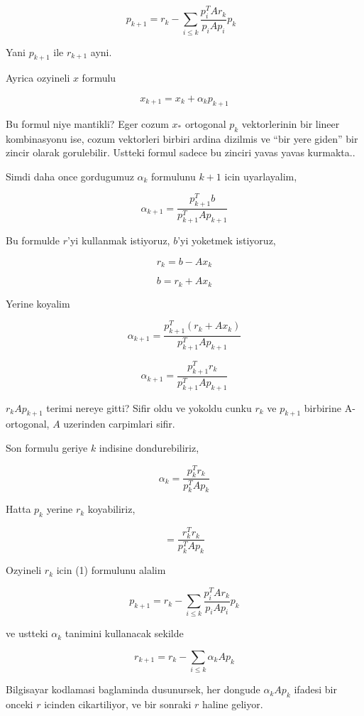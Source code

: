 \documentclass[12pt,fleqn]{article}\usepackage{../common}
\begin{document}
\[ p_{k+1} = r_k - \sum_{i \le k} \frac{ p_i^TAr_k}{p_iAp_i}p_k  \ \ \
\label{1} \]

Yani $p_{k+1}$ ile $r_{k+1}$ ayni. 

Ayrica ozyineli $x$ formulu

\[ x_{k+1} = x_k + \alpha_k p_{k+1} \]

Bu formul niye mantikli? Eger cozum $x_*$ ortogonal $p_k$ vektorlerinin bir
lineer kombinasyonu ise, cozum vektorleri birbiri ardina dizilmis ve ``bir
yere giden'' bir zincir olarak gorulebilir. Ustteki formul sadece bu
zinciri yavas yavas kurmakta..

Simdi daha once gordugumuz $\alpha_{k}$ formulunu $k+1$ icin uyarlayalim,

\[ \alpha_{k+1} = \frac{p_{k+1}^Tb}{p_{k+1}^T A p_{k+1}} \]

Bu formulde $r$'yi kullanmak istiyoruz, $b$'yi yoketmek istiyoruz,

\[ r_k = b - Ax_k \]

\[ b = r_k + Ax_k   \]

Yerine koyalim

\[ \alpha_{k+1} = \frac{p_{k+1}^T(r_k + Ax_k  )}{p_{k+1}^T A p_{k+1}} \]

\[ \alpha_{k+1} = \frac{p_{k+1}^Tr_k }{p_{k+1}^T A p_{k+1}} \]

$r_kA p_{k+1}$ terimi nereye gitti? Sifir oldu ve yokoldu cunku $r_k$ ve $
p_{k+1}$ 
birbirine A-ortogonal, $A$ uzerinden carpimlari sifir.

Son formulu geriye $k$ indisine dondurebiliriz,

\[ \alpha_k = \frac{p_{k}^Tr_k }{p_{k}^T A p_{k}} \]

Hatta $p_k$ yerine $r_k$ koyabiliriz,

\[  = \frac{r_{k}^Tr_k }{p_{k}^T A p_{k}} \]

Ozyineli $r_k$ icin (1) formulunu alalim

\[ p_{k+1} = r_k - \sum_{i \le k} \frac{ p_i^TAr_k}{p_iAp_i}p_k \]

ve ustteki $\alpha_k$ tanimini kullanacak sekilde

\[ r_{k+1} = r_k - \sum_{i \le k} \alpha_k A p_k \]

Bilgisayar kodlamasi baglaminda dusunursek, her dongude $\alpha_k A p_k$ ifadesi bir
onceki $r$ icinden cikartiliyor, ve bir sonraki $r$ haline geliyor.



\end{document}
